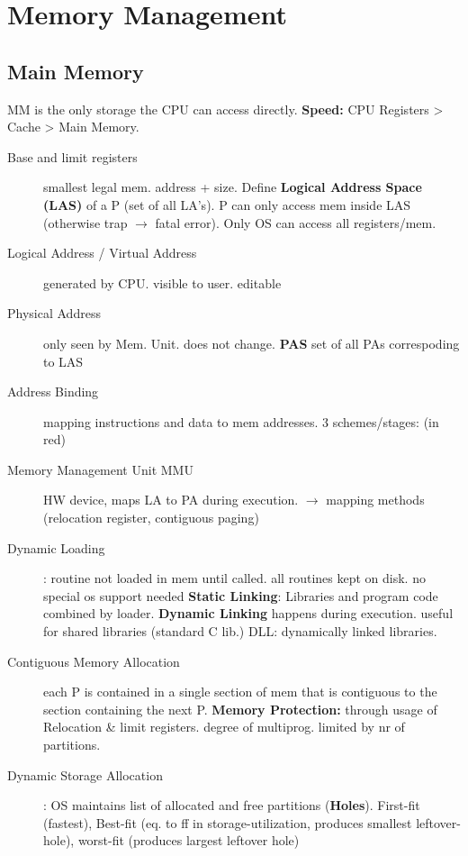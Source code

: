 \section*{Memory Management}
\subsection*{Main Memory}
MM is the only storage the CPU can access directly. \textbf{Speed:} CPU Registers > Cache > Main Memory.
\begin{description}
    \item[Base and limit registers] smallest legal mem. address + size. Define \textbf{Logical Address Space (LAS)} of a P (set of all LA's). P can only access mem inside LAS (otherwise trap $\rightarrow$ fatal error). Only OS can access all registers/mem. \\
    \item[Logical Address / Virtual Address] generated by CPU. visible to user. editable \\
    \item[Physical Address] only seen by Mem. Unit. does not change. \textbf{PAS} set of  all PAs correspoding to LAS \\
    \item[Address Binding] mapping instructions and data to mem addresses. 3 schemes/stages: (in red) \\
    \item[Memory Management Unit MMU] HW device, maps LA to PA during execution. $\rightarrow$ mapping methods (relocation register, contiguous paging) \\
    \item[Dynamic Loading]: routine not loaded in mem until called. all routines kept on disk. no special os support needed \textbf{Static Linking}: Libraries and program code combined by loader. \textbf{Dynamic Linking} happens during execution. useful for shared libraries (standard C lib.) DLL: dynamically linked libraries. \\
    \item[Contiguous Memory Allocation] each P is contained in a single section of mem that is contiguous to the section containing the next P. \textbf{Memory Protection:} through usage of Relocation \& limit registers. degree of multiprog. limited by nr of partitions. \\
    \item[Dynamic Storage Allocation]: OS maintains list of allocated and free partitions (\textbf{Holes}). First-fit (fastest), Best-fit (eq. to ff in storage-utilization, produces smallest leftover-hole), worst-fit (produces largest leftover hole) \\

\end{description}
